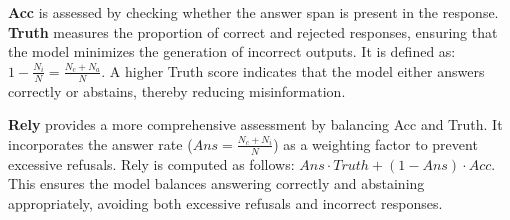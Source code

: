 \textbf{Acc} is assessed by checking whether the answer span is present in the response.
\textbf{Truth} measures the proportion of correct and rejected responses, ensuring that the model minimizes the generation of incorrect outputs.
It is defined as: $1 - \frac{N_i}{N} = \frac{N_c + N_a}{N}$.
A higher Truth score indicates that the model either answers correctly or abstains, thereby reducing misinformation.


\textbf{Rely} provides a more comprehensive assessment by balancing Acc and Truth.
It incorporates the answer rate ($Ans = \frac{N_c + N_i}{N}$) as a weighting factor to prevent excessive refusals.
Rely is computed as follows: $Ans \cdot Truth + (1 - Ans) \cdot Acc$.
This ensures the model balances answering correctly and abstaining appropriately, avoiding both excessive refusals and incorrect responses.


